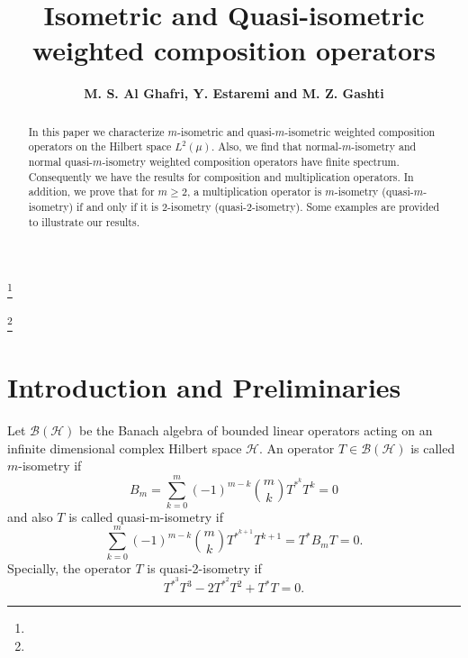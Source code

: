 \documentclass{amsart}
\theoremstyle{definition}\newtheorem{defn}[thm]{Definition}
\theoremstyle{remark}
\numberwithin{equation}{section}
\begin{document}
\title[]
{Isometric and Quasi-isometric weighted composition operators}

\author{\sc\bf M. S. Al Ghafri, Y. Estaremi and M. Z. Gashti}
\address{\sc M. S. Al Ghafri}
\address{Department of Mathematics, University of Technology and Applied Sciences, Rustaq {329},  Oman.}
\address{\sc Y. Estaremi}
\address{Department of Mathematics, Faculty of Sciences, Golestan University, Gorgan, Iran.}

\address{\sc M. Z. Gashti}
\address{German Informatics Society, Hamburg, Germany.}

\thanks{}

\thanks{}



\date{}

\dedicatory{}

\commby{}

\begin{abstract}
In this paper we characterize $m$-isometric and quasi-$m$-isometric weighted composition operators on the Hilbert space $L^2(\mu)$. Also, we find that normal-$m$-isometry and normal quasi-$m$-isometry weighted composition operators have finite spectrum. Consequently we have the results for composition and multiplication operators. In addition, we prove that for $m\geq 2$, a multiplication operator is $m$-isometry (quasi-$m$-isometry) if and only if it is $2$-isometry (quasi-$2$-isometry). Some examples are provided to illustrate our results.

\end{abstract}

\maketitle

\section{ \sc\bf Introduction and Preliminaries}

Let  $\mathcal{B}(\mathcal{H})$ be the Banach algebra of bounded linear operators acting on an infinite
dimensional complex Hilbert space $\mathcal{H}$. An operator $T\in \mathcal{B}(\mathcal{H})$ is called $m$-isometry if 
$$B_m=\sum_{k=0}^{m}(-1)^{m-k}\binom{m}{k}T^{*^{k}}T^{k}=0$$
and also $T$ is called quasi-m-isometry if
 $$\sum_{k=0}^{m}(-1)^{m-k}\binom{m}{k}T^{*^{k+1}}T^{k+1}=T^*B_mT=0.$$ 
 Specially, the operator $T$ is quasi-2-isometry if 
$$T^{*^3}T^3-2T^{*^2}T^2+T^*T=0.$$
\end{document}
